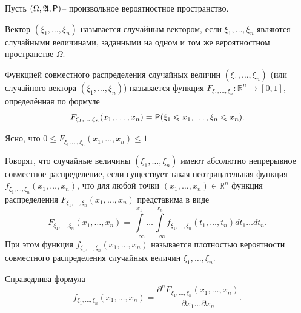
Пусть $(\Omega,\mathfrak{A},\P)$-- произвольное вероятностное пространство.

\begin{definition}
\label{def:15.1}
	Вектор $(\xi_1, \dots, \xi_n)$ называется случайным вектором, если $\xi_1, \dots, \xi_n$ являются случайными величинами, заданными на одном
и том же вероятностном пространстве $\Omega$.
\end{definition}

\begin{definition}
\label{def:15.2}
	Функцией совместного распределения случайных
величин $(\xi_1, \dots, \xi_n)$ (или случайного вектора $(\xi_1, \dots, \xi_n)$) называется функция $F_{\xi_1, \dots, \xi_n} : \mathbb{R}^n \rightarrow [0, 1]$, определённая по формуле
\begin{equation*}
	F_{\xi_1, \dots, \xi_n}(x_1,\dots,x_n)=\P(\xi_1\leqslant x_1,\dots,\xi_n\leqslant x_n).
\end{equation*}

Ясно, что $0 \leqslant F_{\xi_1, \dots, \xi_n}(x_1,\dots,x_n) \leqslant 1$

\end{definition}

\begin{definition}
\label{def:15.3}
	Говорят, что случайные величины $(\xi_1, \dots, \xi_n)$ имеют абсолютно непрерывное совместное распределение, если существует
такая неотрицательная функция $f_{\xi_1, \dots, \xi_n}(x_1,\dots,x_n)$, что для любой точки
$(x_1,\dots,x_n)\in\mathbb{R}^n$ функция распределения $F_{\xi_1, \dots, \xi_n}(x_1,\dots,x_n)$ представима в
виде
\begin{equation*}
	F_{\xi_1, \dots, \xi_n}(x_1,\dots,x_n)=\int\limits_{-\infty}^{x_1}\ldots
	\int\limits_{-\infty}^{x_n}f_{\xi_1, \dots, \xi_n}(t_1,\dots,t_n)dt_1\ldots dt_n.
\end{equation*}
При этом функция $f_{\xi_1, \dots, \xi_n}(x_1,\dots,x_n)$ называется плотностью вероятности совместного распределения случайных величин ${\xi_1, \dots, \xi_n}$.
\end{definition}

\begin{lemma}
\label{lemma:15.4}
Справедлива формула
	\begin{equation*}
		f_{\xi_1, \dots, \xi_n}(x_1,\dots,x_n)=\frac
		{\partial^nF_{\xi_1, \dots, \xi_n}(x_1,\dots,x_n)}
		{\partial x_1\ldots \partial x_n}.
	\end{equation*}
\end{lemma}

